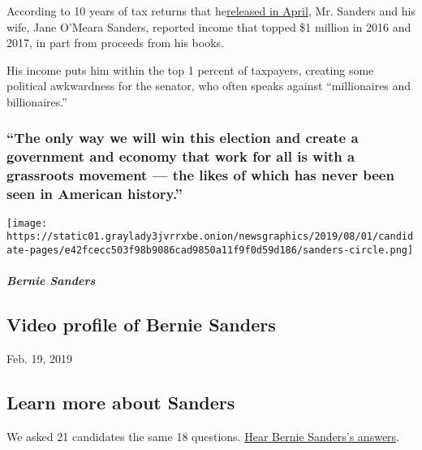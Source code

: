 According to 10 years of tax returns that
he\href{https://www.nytimes3xbfgragh.onion/2019/04/15/us/politics/bernie-sanders-taxes.html}{}\href{https://www.nytimes3xbfgragh.onion/2019/04/15/us/politics/bernie-sanders-taxes.html}{released
in April}, Mr. Sanders and his wife, Jane O'Meara Sanders, reported
income that topped \$1 million in 2016 and 2017, in part from proceeds
from his books.

His income puts him within the top 1 percent of taxpayers, creating some
political awkwardness for the senator, who often speaks against
``millionaires and billionaires.''

\hypertarget{the-only-way-we-will-win-this-election-and-create-a-government-and-economy-that-work-for-all-is-with-a-grassroots-movement--the-likes-of-which-has-never-been-seen-in-american-history}{%
\subsubsection{``The only way we will win this election and create a
government and economy that work for all is with a grassroots movement
--- the likes of which has never been seen in American
history.''}\label{the-only-way-we-will-win-this-election-and-create-a-government-and-economy-that-work-for-all-is-with-a-grassroots-movement--the-likes-of-which-has-never-been-seen-in-american-history}}

\texttt{[image: https://static01.graylady3jvrrxbe.onion/newsgraphics/2019/08/01/candidate-pages/e42fcecc503f98b9086cad9850a11f9f0d59d186/sanders-circle.png]}

\hypertarget{bernie-sanders-1}{%
\subparagraph{Bernie Sanders}\label{bernie-sanders-1}}

\hypertarget{video-profile-of-bernie-sanders}{%
\subsection{Video profile of Bernie
Sanders}\label{video-profile-of-bernie-sanders}}

Feb. 19, 2019

\hypertarget{learn-more-about-sanders}{%
\subsection{Learn more about Sanders}\label{learn-more-about-sanders}}

We asked 21 candidates the same 18 questions.
\href{https://www.nytimes3xbfgragh.onion/interactive/2019/us/politics/bernie-sanders-2020-campaign.html}{Hear
Bernie Sanders's answers}.

